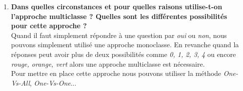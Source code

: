 \begin{enumerate}
    \item \textbf{Dans quelles circonstances et pour quelles raisons utilise-t-on l'approche multiclasse ? Quelles sont les différentes possibilités pour cette approche ?} \\
    Quand il faut simplement répondre à une question par \textit{oui} ou \textit{non}, nous pouvons simplement utilisé une approche monoclasse. En revanche quand la réponses peut avoir plus de deux possibilités comme \textit{0, 1, 2, 3, 4}
    ou encore \textit{rouge, orange, vert} alors une approche multiclasse est nécessaire. \\
    Pour mettre en place cette approche nous pouvons utiliser la méthode \textit{One-Vs-All}, \textit{One-Vs-One}...

\end{enumerate}

